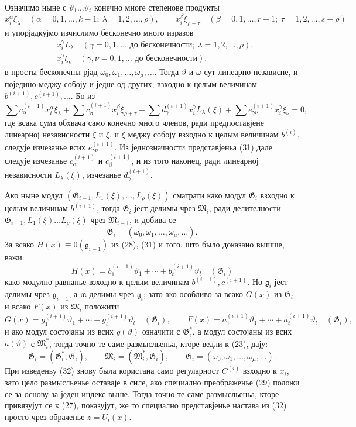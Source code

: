 \documentclass[11pt]{article}
\providecommand{\Gmod}{\mathfrak G}
\providecommand{\Mmod}{\mathfrak M}
\providecommand{\mideal}{\mathfrak m}
\providecommand{\gideal}{\mathfrak g}
\begin{document}
Означимо ныне с $\vartheta_1\ldots\vartheta_t$ конечно многе степенове продукты
\[
 x_i^\alpha\xi_\lambda\quad(\alpha=0,1,\ldots,k-1;\ \lambda=1,2,\ldots,\rho),\qquad
 x_i^\beta\xi_{\rho+\tau}\quad(\beta=0,1,\ldots,r-1;\ \tau=1,2,\ldots,s-\rho)
\]
и упорјадкујмо изчислимо бесконечно много изразов
\[
\begin{aligned}
 &x_i^\gamma L_\lambda\quad(\gamma=0,1,\ldots\text{ до бесконечности};\ \lambda=1,2,\ldots,\rho),\\
 &x_i^\gamma\xi_\nu\quad(\gamma,\nu=0,1,\ldots\text{ до бесконечности}).
\end{aligned}
\]
в просты бесконечны рјад $\omega_0,\omega_1,\ldots,\omega_\mu,\ldots$. Тогда $\vartheta$ и $\omega$ сут линеарно независне, и поједино меджу собоју и једне од других, взходно к целым величинам $b^{(i+1)},c^{(i+1)},\ldots$. Бо из
\[
 \sum c^{(i+1)}_\alpha x_i^\alpha\xi_\lambda+
 \sum c^{(i+1)}_\beta x_i^\beta\xi_{\rho+\tau}+
 \sum d^{(i+1)}_\gamma x_i^\gamma L_\lambda(\xi)+
 \sum e^{(i+1)}_{\gamma\nu}x_i^\gamma\xi_\nu=0,
\]
где всака сума обхвача само конечно много членов, ради предпоставјене линеарној независности $\xi$ и $\xi$, и $\xi$ меджу собоју взходно к целым величинам $b^{(i)}$, следује изчезанье всих $e^{(i+1)}_{\gamma\nu}$. Из једнозначности представјеньа (31) дале следује изчезанье $c^{(i+1)}_\alpha$ и $c^{(i+1)}_\beta$, и из того наконец, ради линеарној независности $L_\lambda(\xi)$, изчезанье $d^{(i+1)}_\gamma$.

Ако ныне модул $(\Gmod_{i-1},L_1(\xi),\ldots,L_\rho(\xi))$ сматрати како модул $\Gmod_i$ взходно к целым величинам $b^{(i+1)}$, тогда $\Gmod_i$ јест делимы чрез $\Mmod_i$, ради делителности $\Gmod_{i-1},L_1(\xi)\ldots L_\rho(\xi)$ чрез $\Mmod_{i-1}$, и добива се
\[
 \Gmod_i=(\omega_0,\omega_1,\ldots,\omega_\mu,\ldots).
\]
За всако $H(x)\equiv0(\gideal_{i-1})$ из (28), (31) и того, што было доказано вышше, важи:
\[
 H(x)=b^{(i+1)}_1\vartheta_1+\cdots+b^{(i+1)}_t\vartheta_t\quad(\Gmod_i)
\]
како модулно равнанье взходно к целым величинам $b^{(i+1)},c^{(i+1)}$. Но $\gideal_i$ јест делимы чрез $\gideal_{i-1}$, а $\mideal$ делимы чрез $\gideal_i$; зато ако особливо за всако $G(x)$ из $\Gmod_i$ и всако $F(x)$ из $\Mmod_i$ положити
\[
 G(x)=g^{(i+1)}_1\vartheta_1+\cdots+g^{(i+1)}_t\vartheta_t\quad(\Gmod_i),\qquad
 F(x)=a^{(i+1)}_1\vartheta_1+\cdots+a^{(i+1)}_t\vartheta_t\quad(\Gmod_i),
\]
и ако модул состојаны из всих $g(\vartheta)$ означити с $\Gmod_i^*$, а модул состојаны из всих $a(\vartheta)$ с $\Mmod_i^*$, тогда точно те саме размысльеньа, кторе ведли к (23), дају:
\begin{equation}
 \Gmod_i=(\Gmod_i^*,\Gmod_i),\qquad
 \Mmod_i=(\Mmod_i^*,\Gmod_i),\qquad
 \Gmod_i=(\omega_0,\omega_1,\ldots,\omega_\mu,\ldots).
\tag{32}
\end{equation}
При изведеньу (32) знову была користана само регуларност $C^{(i)}$ взходно к $x_i$, зато цело размысльенье оставаје в силе, ако специално преображенье (29) положи се за основу за једен индекс выше. Тогда точно те саме размысльеньа, кторе привязујут се к (27), показујут, же то специално представјенье настава из (32) просто чрез обраченье $z=U_i(x)$.
\end{document}
